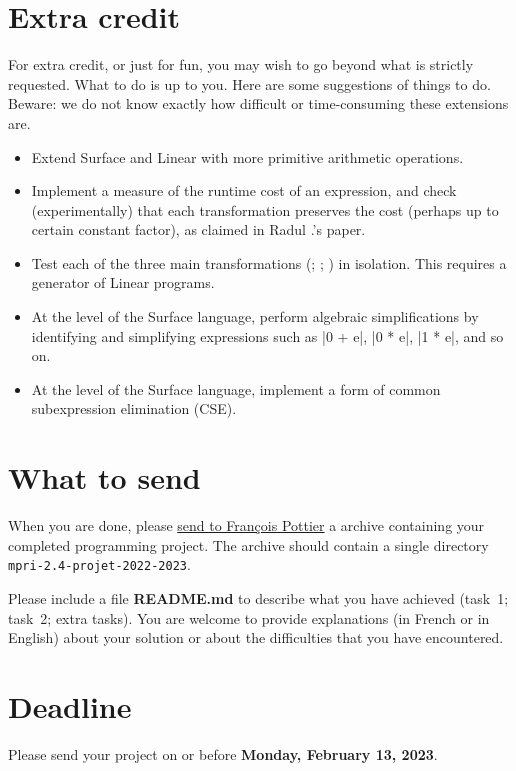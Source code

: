 \documentclass{article}
\begin{document}

\section{Extra credit}

For extra credit, or just for fun, you may wish to go beyond what is strictly
requested. What to do is up to you. Here are some suggestions of things to do.
Beware: we do not know exactly how difficult or time-consuming these
extensions are.
%
\begin{itemize}
\item Extend Surface and Linear with more primitive arithmetic operations.
\item Implement a measure of the runtime cost of an expression,
      and check (experimentally) that each transformation preserves the cost
      (perhaps up to certain constant factor),
      as claimed in Radul \etal.'s paper.
\item Test each of the three main transformations
      (\fmad; \unzipping; \transposition) in isolation.
      This requires a generator of Linear programs.
\item At the level of the Surface language,
      perform algebraic simplifications by identifying
      and simplifying expressions such as \oc|0 + e|,
      \oc|0 * e|, \oc|1 * e|, and so on.
\item At the level of the Surface language,
      implement a form of common subexpression elimination (CSE).
\end{itemize}


\section{What to send}

When you are done, please \href{mailto:francois.pottier@inria.fr}{send to
  François Pottier} a  archive containing your completed
programming project. The archive should contain a single
directory \texttt{mpri-2.4-projet-2022-2023}.

Please include a file \textbf{README.md} to describe what you have achieved
(task~1; task~2; extra tasks). You are welcome to provide explanations (in
French or in English) about your solution or about the difficulties that you
have encountered.


\section{Deadline}

Please send your project on or before
\textbf{Monday, February 13, 2023}.



\end{document}
